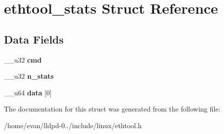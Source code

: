 \section{ethtool\-\_\-stats \-Struct \-Reference}
\label{structethtool__stats}
\subsection*{\-Data \-Fields}
\begin{DoxyCompactItemize}
\item 
\-\_\-\-\_\-u32 {\bfseries cmd}\label{structethtool__stats_a66d231264d5aa36fd7d347e2c967769a}

\item 
\-\_\-\-\_\-u32 {\bfseries n\-\_\-stats}\label{structethtool__stats_a59d24b7bfd9278f3fc932327bd1ed832}

\item 
\-\_\-\-\_\-u64 {\bfseries data} [0]\label{structethtool__stats_a7852bf7679a05e9065b7b7ccc905bc45}

\end{DoxyCompactItemize}


\-The documentation for this struct was generated from the following file\-:\begin{DoxyCompactItemize}
\item 
/home/evan/lldpd-\/0../include/linux/ethtool.\-h\end{DoxyCompactItemize}
